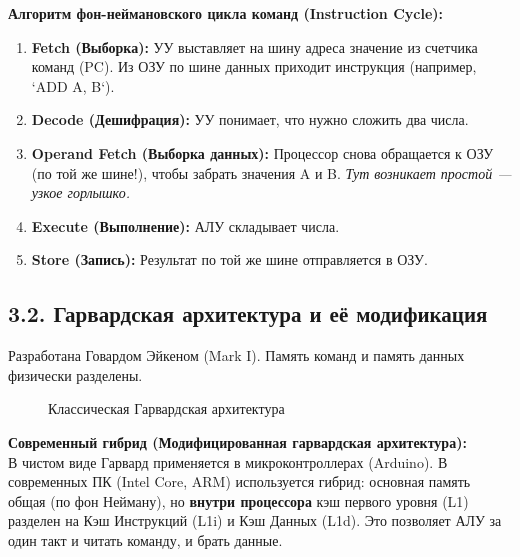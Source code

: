 \documentclass[12pt,a4paper]{article}
\theoremstyle{remark}
\begin{document}
\textbf{Алгоритм фон-неймановского цикла команд (Instruction Cycle):}
\begin{enumerate}
    \item \textbf{Fetch (Выборка):} УУ выставляет на шину адреса значение из счетчика команд (PC). Из ОЗУ по шине данных приходит инструкция (например, `ADD A, B`).
    \item \textbf{Decode (Дешифрация):} УУ понимает, что нужно сложить два числа.
    \item \textbf{Operand Fetch (Выборка данных):} Процессор снова обращается к ОЗУ (по той же шине!), чтобы забрать значения A и B. \textit{Тут возникает простой — узкое горлышко.}
    \item \textbf{Execute (Выполнение):} АЛУ складывает числа.
    \item \textbf{Store (Запись):} Результат по той же шине отправляется в ОЗУ.
\end{enumerate}

\subsection*{3.2. Гарвардская архитектура и её модификация}
Разработана Говардом Эйкеном (Mark I). Память команд и память данных физически разделены.

\begin{figure}[H]
    \centering
    \caption{Классическая Гарвардская архитектура}
\end{figure}

\textbf{Современный гибрид (Модифицированная гарвардская архитектура):}\\
В чистом виде Гарвард применяется в микроконтроллерах (Arduino). В современных ПК (Intel Core, ARM) используется гибрид: основная память общая (по фон Нейману), но \textbf{внутри процессора} кэш первого уровня (L1) разделен на Кэш Инструкций (L1i) и Кэш Данных (L1d). Это позволяет АЛУ за один такт и читать команду, и брать данные.
\end{document}
